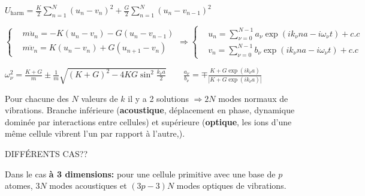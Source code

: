 \begin{squishlist}
    \item $U_{\text{harm}} = \frac{K}{2}\sum_{n=1}^{N}(u_n - v_n)^2 + \frac{G}{2} \sum_{n=1}^{N} (u_n - v_{n-1})^2$
    \item $\left\{ \begin{aligned}
        & m\ddot{u}_n = -K (u_n - v_n) - G(u_n - v_{n-1}) \\
        & m\ddot{v}_n = K (u_n - v_n) + G(u_{n+1} - v_{n})
    \end{aligned}\right.
    \Rightarrow 
    \left\{ \begin{aligned}
        & u_n = \sum_{\nu = 0}^{N-1} a_{\nu} \exp (i k_{\nu}na - i\omega_{\nu}t) + c.c \\
        & v_n = \sum_{\nu = 0}^{N-1} b_{\nu} \exp (i k_{\nu}na - i\omega_{\nu}t) + c.c
    \end{aligned}\right.$

    \item $\omega_{\nu}^2 = \frac{K+G}{m} \pm \frac{1}{m}\sqrt{(K+G)^2 - 4KG \sin^2 \frac{k_{\nu}a}{2}} \qquad \frac{a_{\nu}}{b_{\nu}} = \mp \frac{K + G\exp(ik_{\nu}a)}{|K + G\exp(ik_{\nu}a)|}$
    \item Pour chacune des $N$ valeurs de $k$ il y a 2 solutions $\Rightarrow 2N$ modes normaux de vibrations. Branche inférieure (\textbf{acoustique}, déplacement en phase, dynamique dominée par interactions entre cellules) et supérieure (\textbf{optique}, les ions d’une même cellule vibrent l’un par rapport à l’autre,).
    \item DIFFÉRENTS CAS??
    \item Dans le cas \textbf{à 3 dimensions:} pour une cellule primitive avec une base de $p$ atomes, $3N$ modes acoustiques et $(3p - 3)N$ modes optiques de vibrations.
\end{squishlist}

